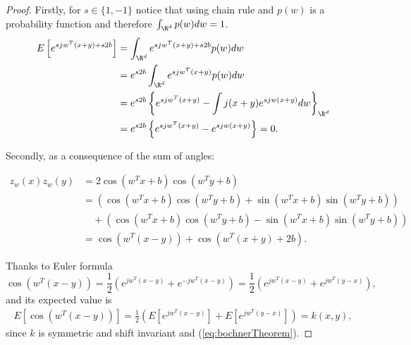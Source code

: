 \begin{proof}{
Firstly, for $s \in \{1,-1\}$ notice that using chain rule and 
$p(w)$ is a probability function and therefore 
$\int_{\R^d} p(w) dw = 1$.
\begin{align}
    \label{eq:expected_value}
    E\left[ e^{sj w^T(x+y)+s2b}\right]
    & = 
    \int_{\R^d} e^{sj w^T(x+y)+s2b} p(w) dw
    \nonumber
    \\
    \nonumber
    & = 
    e^{s2b}\int_{\R^d} e^{sj w^T(x+y)} p(w) dw
    \\
    \nonumber
    & = 
    e^{s2b}\left\{ 
        e^{sj w^T(x+y)} 
        - 
        \int j(x+y) e^{sj w (x + y)} dw
    \right\}_{\R^d}
    \\
    & = 
    e^{s2b}\left\{ 
        e^{sj w^T(x+y)} 
        - 
         e^{sj w (x + y)} 
    \right\}
    = 0.
\end{align}

Secondly, as a consequence of the sum of angles: 

\begin{align}
    z_w(x) z_w(y) 
    &=
    2  \cos\left(w^T x + b\right) \cos\left(w^T y+ b\right)
    \nonumber
    \\
    \nonumber
    & = 
    \left(
    \cos\left(w^T x + b\right) \cos\left(w^T y+ b\right)
    + 
    \sin\left(w^T x + b\right) \sin\left(w^T y+ b\right)
    \right)
    \\
    \nonumber
   & \quad +
   \left(
    \cos\left(w^T x + b\right) \cos\left(w^T y+ b\right)
    -
    \sin\left(w^T x + b\right) \sin\left(w^T y+ b\right)
    \right)
    \\
    & = 
    \cos\left(w^T (x-y) \right) + \cos\left(w^T (x+y) + 2b \right).
\end{align}

Thanks to Euler formula
\begin{equation}
    \cos\left(w^T (x-y) \right)
    = 
    \frac{1}{2}
    \left(
        e^{j w^T (x-y)}
        + 
        e^{- j w^T (x-y)}
    \right)
    = 
     \frac{1}{2}
    \left(
        e^{j w^T (x-y)}
        + 
        e^{j w^T (y-x)}
    \right),
\end{equation}
and its expected value is 
\begin{align}
    E\left[
        \cos\left(w^T (x-y) \right)
    \right]
    = 
    \frac{1}{2}
    \left(
        E\left[
         e^{j w^T (x-y)}
        \right]
        + 
        E\left[
         e^{j w^T (y-x)}
        \right]
    \right)
    = k(x,y),
\end{align}
since $k$ is symmetric and shift invariant and (\ref{eq:bochnerTheorem}).

}
\end{proof}
